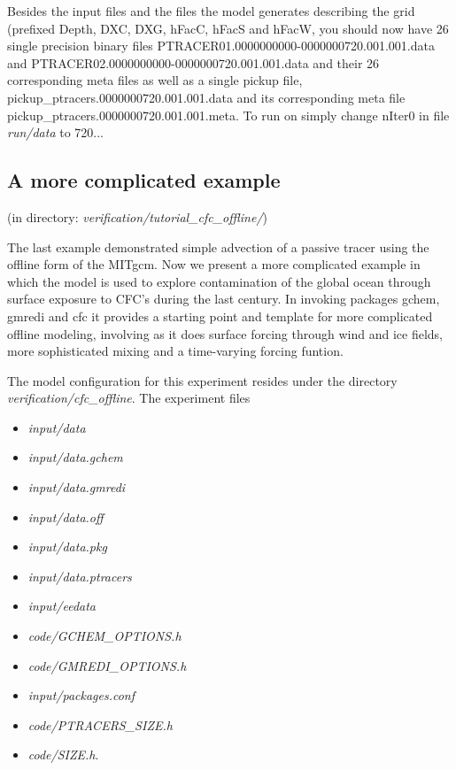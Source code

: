 Besides the input files and the files the model generates describing
the grid (prefixed Depth, DXC, DXG, hFacC, hFacS and hFacW, you should
now have 26 single precision binary files
PTRACER01.0000000000-0000000720.001.001.data and
PTRACER02.0000000000-0000000720.001.001.data and their 26
corresponding meta files as well as a single pickup file,
pickup\_ptracers.0000000720.001.001.data and its corresponding meta
file pickup\_ptracers.0000000720.001.001.meta. To run on simply change
nIter0 in file {\it run/data} to 720...

\subsection{A more complicated example}
\label{sect:eg-offline-cfc}
\begin{center}
(in directory: {\it verification/tutorial\_cfc\_offline/})\\
\end{center}

\noindent The last example demonstrated simple advection of a passive
tracer using the offline form of the MITgcm. Now we present a more
complicated example in which the model is used to explore
contamination of the global ocean through surface exposure to CFC's
during the last century. In invoking packages gchem, gmredi and cfc it
provides a starting point and template for more complicated offline
modeling, involving as it does surface forcing through wind and ice
fields, more sophisticated mixing and a time-varying forcing funtion.

\vspace{0.5cm}

\noindent The model configuration for this experiment resides under
the directory {\it verification/cfc\_offline}.  The experiment files

\begin{itemize}
\item {\it input/data}
\item {\it input/data.gchem}
\item {\it input/data.gmredi}
\item {\it input/data.off}
\item {\it input/data.pkg}
\item {\it input/data.ptracers}
\item {\it input/eedata}
\item {\it code/GCHEM\_OPTIONS.h}
\item {\it code/GMREDI\_OPTIONS.h}
\item {\it input/packages.conf}
\item {\it code/PTRACERS\_SIZE.h}
\item {\it code/SIZE.h}. 
\end{itemize}

